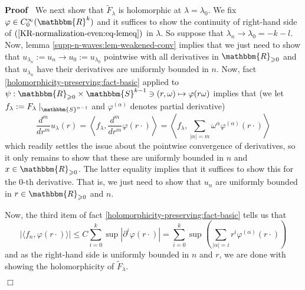 \documentclass{article}
\newcommand{\assign}{:=}
\renewenvironment{proof}{\noindent\textbf{Proof\ }}{\hspace*{\fill}$\Box$\medskip}
\theoremstyle{remark}
\begin{document}
\begin{proof}
  We next show that $\tilde{F}_{\lambda}$ is holomorphic at $\lambda =
  \lambda_0$. We fix $\varphi \in C^{\infty}_0 (\mathbbm{R}^k)$ and it
  suffices to show the continuity of right-hand side of
  $(\ref{KR-normalization-even:eq-lemeq})$ in $\lambda$. So suppose that
  $\lambda_n \rightarrow \lambda_0 = - k - l$. Now, lemma
  \ref{supp-n-waves:lem-weakened-conv} implies that we just need to show that
  $u_{\lambda_n} \assign u_n \rightarrow u_0 \assign u_{\lambda_0}$ pointwise
  with all derivatives in $\mathbbm{R}_{\geqslant 0}$ and that $u_{\lambda_n}$
  have their derivatives are uniformly bounded in $n$. Now, fact
  \ref{holomorphicity-preserving:fact-basic} applied to $\psi :
  \mathbbm{R}_{\geqslant 0} \times \mathbbm{S}^{k - 1} \ni (r, \omega) \mapsto
  \varphi (r \omega)$ implies that (we let $f_{\lambda} \assign F_{\lambda}
  \mid_{\mathbbm{S}^{n - 1}}$ and $\varphi^{(\alpha)}$ denotes partial
  derivative)
  \[ \frac{d^m}{d r^m} u_{\lambda} (r) = \left\langle f_{\lambda},
     \frac{d^m}{d r^m} \varphi (r \cdot) \right\rangle = \left\langle
     f_{\lambda}, \sum_{| \alpha | = m} \omega^{\alpha} \varphi^{(\alpha)} (r
     \cdot) \right\rangle \]
  which readily settles the issue about the pointwise convergence of
  derivatives, so it only remains to show that these are uniformly bounded in
  $n$ and $x \in \mathbbm{R}_{\geqslant 0}$. The latter equality implies that
  it suffices to show this for the 0-th derivative. That is, we just need to
  show that $u_n$ are uniformly bounded in $r \in \mathbbm{R}_{\geqslant 0}$
  and $n$.
  
  Now, the third item of fact \ref{holomorphicity-preserving:fact-basic} tells
  us that
  \[ | \langle f_n, \varphi (r \cdot) \rangle | \leqslant C \sum_{i = 0}^k
     \sup | \partial^i \varphi (r \cdot) | = \sum_{i = 0}^k \sup \left(
     \sum_{| \alpha | = i} r^i \varphi^{(\alpha)} (r \cdot) \right) \]
  and as the right-hand side is uniformly bounded in $n$ and $r$, we are done
  with showing the holomorphicity of $\tilde{F}_{\lambda}$.
  

\end{proof}
\end{document}
